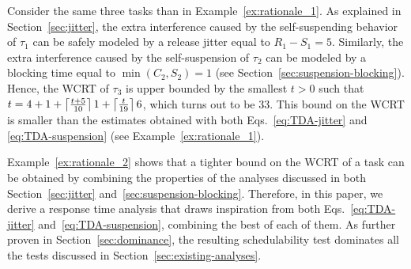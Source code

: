 \begin{example}
\label{ex:rationale_2}  
Consider the same three tasks than in Example~\ref{ex:rationale_1}. As explained in Section~\ref{sec:jitter}, the extra interference caused by the self-suspending behavior of $\tau_1$ can be safely modeled by a release jitter equal to $R_1 - S_1 = 5$. Similarly, the extra interference caused by the self-suspension of $\tau_2$ can be modeled by a blocking time equal to $\min(C_2,S_2) = 1$ (see Section~\ref{sec:suspension-blocking}). Hence, the WCRT of $\tau_3$ is upper bounded by the smallest $t>0$ such that $t = 4 + 1 +\left\lceil{ \frac{t + 5}{10} }\right\rceil 1 +\left\lceil{ \frac{t}{19} }\right\rceil 6$, which turns out to be $33$. This bound on the WCRT is smaller than the estimates obtained with both Eqs.~\eqref{eq:TDA-jitter} and \eqref{eq:TDA-suspension} (see Example~\ref{ex:rationale_1}).
\hfill\myendproof
\end{example}


Example~\ref{ex:rationale_2} shows that a tighter bound on the WCRT of a task can be obtained by combining the properties of the analyses discussed in both Section~\ref{sec:jitter} and~\ref{sec:suspension-blocking}. Therefore, in this paper, we derive a response time analysis that draws inspiration from both Eqs.~\eqref{eq:TDA-jitter} and~\eqref{eq:TDA-suspension}, combining the best of each of them. As further proven in Section~\ref{sec:dominance}, the resulting schedulability test dominates all the tests discussed in Section~\ref{sec:existing-analyses}.

